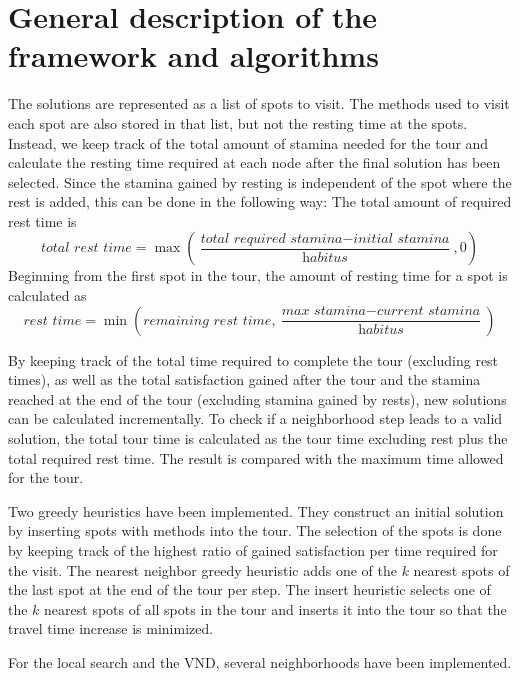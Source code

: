 \documentclass{article}
\begin{document}
\section{General description of the framework and algorithms}

The solutions are represented as a list of spots to visit. The methods used to visit each spot are also stored in that list, but not the
resting time at the spots. Instead, we keep track of the total amount of stamina needed for the tour and calculate the resting time required 
at each node after the final solution has been selected. 
Since the stamina gained by resting is independent of the spot where the rest is added, this can be done in the following way: 
The total amount of required rest time is 
\[
\textit{total rest time} = \max\left(\frac{\textit{total required stamina} - \textit{initial stamina}}{\textit{habitus}},0\right)
\]
Beginning from the first spot in the tour, the amount of resting time for a spot is calculated as
\[
\textit{rest time} = \min\left(\textit{remaining rest time}, \frac{\textit{max stamina} - \textit{current stamina}}{\textit{habitus}}\right)
\]

By keeping track of the total time required to complete the tour (excluding rest times), as well as the total satisfaction gained after the tour and
the stamina reached at the end of the tour (excluding stamina gained by rests), new solutions can be calculated incrementally. 
To check if a neighborhood step leads to a valid solution, the total tour time is calculated as the tour time excluding rest plus
the total required rest time. The result is compared with the maximum time allowed for the tour.
\medskip

Two greedy heuristics have been implemented. They construct an initial solution by inserting spots with methods into the tour. The selection of the spots 
is done by keeping track of the highest ratio of gained satisfaction per time required for the visit.
The nearest neighbor greedy heuristic adds one of the $k$ nearest spots of the last spot at the end of the tour per step. The insert
heuristic selects one of the $k$ nearest spots of all spots in the tour and inserts it into the tour so that the travel time increase is minimized.
\medskip

For the local search and the VND, several neighborhoods have been implemented. 

\end{document}
